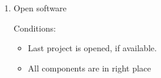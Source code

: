\begin{enumerate}

\item Open software

Conditions:
\begin{itemize}
\item Last project is opened, if available.
\item All components are in right place
\end{itemize}


\end{enumerate}